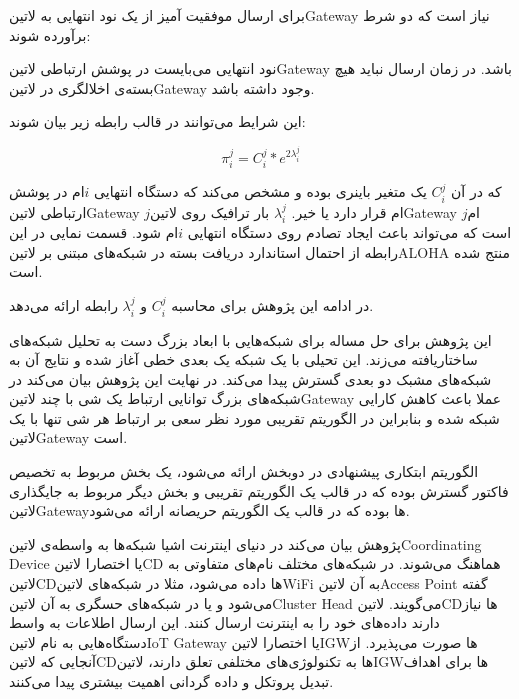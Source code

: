 برای ارسال موفقیت آمیز از یک نود انتهایی به ‌لاتین{Gateway} نیاز است
که دو شرط برآورده شوند:

 نود انتهایی می‌بایست در پوشش ارتباطی ‌لاتین{Gateway} باشد.
 در زمان ارسال نباید هیچ بسته‌ی اخلالگری در ‌لاتین{Gateway} وجود داشته باشد.

این شرایط می‌توانند در قالب رابطه زیر بیان شوند:

\[
  \pi_{i}^{j} = C_{i}^{j} * e^{2\lambda_{i}^{j}}
\]

که در آن $C_{i}^{j}$ یک متغیر باینری بوده و مشخص می‌کند که دستگاه انتهایی $i$ام
در پوشش ارتباطی ‌لاتین{Gateway}
$j$ام قرار دارد یا خیر.
$\lambda_{i}^{j}$
بار ترافیک روی ‌لاتین{Gateway}
$j$ام است که می‌تواند باعث ایجاد تصادم روی دستگاه انتهایی $i$ام شود.
قسمت نمایی در این رابطه از احتمال استاندارد دریافت بسته در شبکه‌های مبتنی بر
‌لاتین{ALOHA} منتج شده است.

در ادامه این پژوهش برای محاسبه $C_{i}^{j}$ و $\lambda_{i}^{j}$
رابطه ارائه می‌دهد.

این پژوهش برای حل مساله برای شبکه‌هایی با ابعاد بزرگ دست به تحلیل شبکه‌های ساختاریافته می‌زند.
این تحیلی با یک شبکه یک بعدی خطی آغاز شده و نتایج آن به شبکه‌های مشبک دو بعدی گسترش پیدا می‌کند.
در نهایت این پژوهش بیان می‌کند در شبکه‌های بزرگ توانایی ارتباط یک شی با چند ‌لاتین{Gateway} عملا
باعث کاهش کارایی شبکه شده و بنابراین در الگوریتم تقریبی مورد نظر سعی بر ارتباط هر شی تنها با یک ‌لاتین{Gateway}
است.

الگوریتم ابتکاری پیشنهادی در دوبخش ارائه می‌شود، یک بخش مربوط به تخصیص فاکتور گسترش بوده که در قالب یک الگوریتم تقریبی
و بخش دیگر مربوط به جایگذاری ‌لاتین{Gateway}ها بوده که در قالب یک الگوریتم حریصانه ارائه می‌شود.


پژوهش  بیان می‌کند در دنیای اینترنت اشیا شبکه‌ها به واسطه‌ی ‌لاتین{Coordinating Device} یا اختصارا ‌لاتین{CD} هماهنگ می‌شوند.
در شبکه‌های مختلف نام‌های متفاوتی به ‌لاتین{CD}ها داده می‌شود، مثلا در شبکه‌های ‌لاتین{WiFi} به آن ‌لاتین{Access Point} گفته می‌شود و یا در شبکه‌های حسگری
به آن ‌لاتین{Cluster Head} می‌گویند.
‌لاتین{CD}ها نیاز دارند داده‌های خود را به اینترنت ارسال کنند. این ارسال اطلاعات به واسط دستگاه‌هایی به نام ‌لاتین{IoT Gateway} یا اختصارا ‌لاتین{IGW}ها
صورت می‌پذیرد.
از آنجایی که ‌لاتین{CD}ها به تکنولوژی‌های مختلفی تعلق دارند، ‌لاتین{IGW}ها برای اهداف تبدیل پروتکل و داده گردانی اهمیت بیشتری پیدا می‌کنند.

